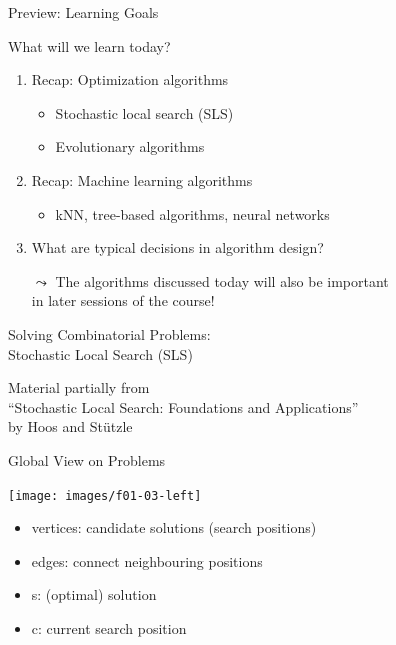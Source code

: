 \begin{frame}[c]{Preview: Learning Goals}

What will we learn today?

\begin{enumerate}
  \item Recap: Optimization algorithms
  \begin{itemize}
    \item Stochastic local search (SLS)
    \item Evolutionary algorithms
  \end{itemize}
  \item Recap: Machine learning algorithms
  \begin{itemize}
    \item kNN, tree-based algorithms, neural networks
  \end{itemize}
  \item What are typical decisions in algorithm design?
  \medskip
  \item[$\leadsto$] The algorithms discussed today will also be important\\ in later sessions of the course! 
\end{enumerate}

\end{frame}
\begin{frame}[c]{}

\vspace{2cm}
\centering
{\huge
Solving Combinatorial Problems:\\
Stochastic Local Search (SLS)
}

\vspace{3cm}
Material partially from\\ ``Stochastic Local Search: Foundations and Applications''\\ by Hoos and Stützle
\end{frame}
\begin{frame}[c]{Global View on Problems}


\begin{center}
\texttt{[image: images/f01-03-left]}
\parbox[t]{5.5cm}{
        \vspace*{-4.5cm}
        \begin{itemize}
        \item vertices: candidate solutions (search positions)
        \bigskip
        \item edges: connect neighbouring positions
        \bigskip
        \item s: (optimal) solution
        \bigskip
        \item c: current search position
        \end{itemize}
}
\end{center}

\end{frame}
